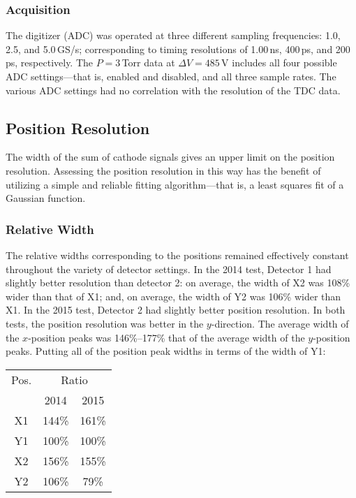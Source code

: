 \subsubsection{Acquisition}
The digitizer (ADC) was operated at three different sampling frequencies: 1.0, 2.5, and 5.0\,GS/s; corresponding to timing resolutions of 1.00\,ns, 400\,ps, and 200\,ps, respectively. The $P=3$\,Torr data at $\Delta V=485$\,V includes all four possible ADC settings---that is, enabled and disabled, and all three sample rates. The various ADC settings had no correlation with the resolution of the TDC data.%

\subsection{Position Resolution}
The width of the sum of cathode signals gives an upper limit on the position resolution. Assessing the position resolution in this way has the benefit of utilizing a simple and reliable fitting algorithm---that is, a least squares fit of a Gaussian function.

\subsubsection{Relative Width}
The relative widths corresponding to the positions remained effectively constant throughout the variety of detector settings. In the 2014 test, Detector 1 had slightly better resolution than detector 2: on average, the width of X2 was 108\% wider than that of X1; and, on average, the width of Y2 was 106\% wider than X1. In the 2015 test, Detector 2 had slightly better position resolution. 
In both tests, the position resolution was better in the $y$-direction. The average width of the $x$-position peaks was 146\%--177\% that of the average width of the $y$-position peaks. Putting all of the position peak widths in terms of the width of Y1:\\%
\begin{center}
\begin{tabular}{ccc}
 \hline 
Pos.& \multicolumn{2}{c}{Ratio} \\ \cline{2-3} 
&2014 & 2015\\\hline\hline
 X1 & 144\%&161\%\\
 Y1 & 100\%&100\%\\
 X2 & 156\%&155\%\\
 Y2 & 106\%&79\%\\\hline
 

\end{tabular}
\end{center}

